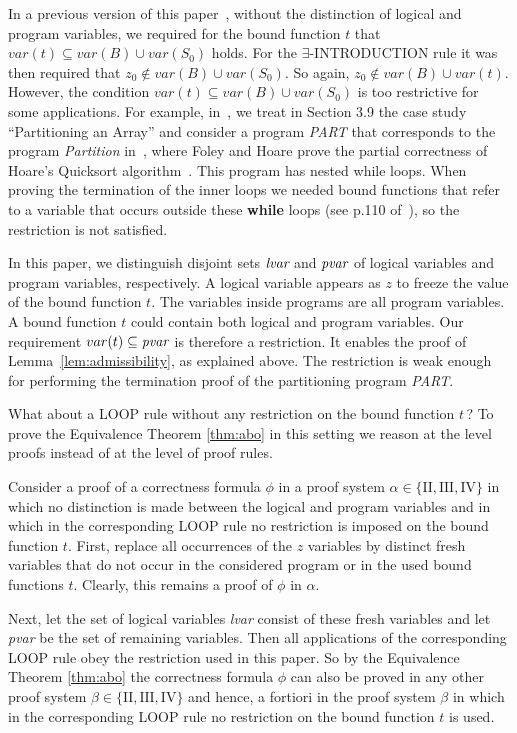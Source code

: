 \documentclass[runningheads]{llncs}       %
\begin{document}
In a previous version of this paper~\cite{ABO25}, 
without the distinction of logical and program variables,
we required for the bound function $t$ that $var(t) \subseteq var(B) \cup var(S_0)$
holds. For the $\exists$-INTRODUCTION rule it was then required that 
$z_0 \not\in var(B) \cup var(S_0)$.
So again,  $z_0 \not\in var(B) \cup var(t)$.
However, the  condition $var(t) \subseteq var(B) \cup var(S_0)$ is too restrictive 
for some applications. For example, in~\cite{ABO09}, we treat in Section 3.9 the case study
``Partitioning an Array'' and consider a program {\it PART} that corresponds to
the program {\it Partition} in~\cite{FH71}, where Foley and Hoare prove the partial correctness
of Hoare's Quicksort algorithm~\cite{Hoa61b}.
This program has nested while loops. When proving the termination of the inner loops we needed
bound functions that refer to a variable that occurs outside these {\bf while} loops
(see p.110 of~\cite{ABO09}), so the restriction is not satisfied.

In this paper, we distinguish disjoint sets $\mbox{\it lvar}$ and $\mbox{\it pvar}$
of logical variables and program variables, respectively.
A logical variable appears as $z$ to freeze the value of the bound function $t$.
The variables inside programs are all program variables.
A bound function $t$ could contain both logical and program variables.
Our requirement $var(t) \subseteq \mbox{\it pvar}$ is therefore a restriction.
It enables the proof of Lemma~\ref{lem:admissibility}, as explained above.
The restriction is weak enough for performing the termination proof
of the partitioning program {\it PART}.

What about a LOOP rule without any restriction on the bound function $t$\,?
To prove the Equivalence Theorem \ref{thm:abo} in this setting we
reason at the level proofs instead of at the level of proof rules.

Consider a proof of a correctness formula $\phi$ in a proof system
$\alpha \in \{\mathrm{II, III, IV}\}$ in which no distinction is made
between the logical and program variables and in which in the
corresponding LOOP rule no restriction is imposed on the bound
function $t$. First, replace all occurrences of the $z$ variables by
distinct fresh variables that do not occur in the considered program
or in the used bound functions $t$. Clearly, this remains a proof of
$\phi$ in $\alpha$.

Next, let the set of logical variables \emph{lvar} consist of these
fresh variables and let \emph{pvar} be the set of remaining variables.
Then all applications of the corresponding LOOP rule obey the
restriction used in this paper. So by the Equivalence Theorem
\ref{thm:abo} the correctness formula $\phi$ can also be proved in any
other proof system $\beta \in \{\mathrm{II, III, IV}\}$ and hence,
a fortiori in the proof system $\beta$ in which in the corresponding
LOOP rule no restriction on the bound function $t$ is used.
\end{document}
